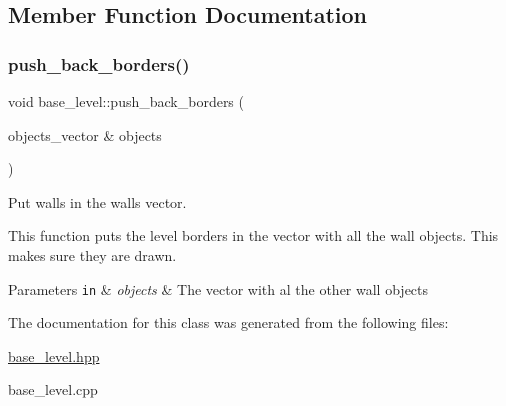 \subsection{Member Function Documentation}
\mbox{\label{classbase__level_a3b2da28cf45cad434103e81ee6c4538d}} 
\subsubsection{\texorpdfstring{push\+\_\+back\+\_\+borders()}{push\_back\_borders()}}
{\footnotesize\ttfamily void base\+\_\+level\+::push\+\_\+back\+\_\+borders (\begin{DoxyParamCaption}\item[{objects\+\_\+vector \&}]{objects }\end{DoxyParamCaption})}



Put walls in the walls vector. 

This function puts the level borders in the vector with all the wall objects. This makes sure they are drawn. 
\begin{DoxyParams}[1]{Parameters}
\mbox{\tt in}  & {\em objects} & The vector with al the other wall objects \\
\hline
\end{DoxyParams}


The documentation for this class was generated from the following files\+:\begin{DoxyCompactItemize}
\item 
\hyperlink{base__level_8hpp}{base\+\_\+level.\+hpp}\item 
base\+\_\+level.\+cpp\end{DoxyCompactItemize}

